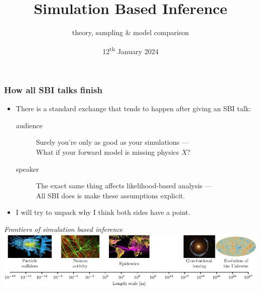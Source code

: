 \documentclass[aspectratio=169]{beamer}
\title{Simulation Based Inference}
\subtitle{theory, sampling \& model comparison}
\date{12\textsuperscript{th} January 2024}
\begin{document}
\begin{frame}
    \titlepage
\end{frame}

\begin{frame}
    \frametitle{How all SBI talks finish}
    \begin{itemize}
        \item There is a standard exchange that tends to happen after giving an SBI talk:

            \begin{description}
                \item[audience] Surely you're only as good as your simulations ---\\What if your forward model is missing physics $X$?
                \item[speaker] The exact same thing affects likelihood-based analysis ---\\
                    All SBI does is make these assumptions explicit.
            \end{description}
        \item I will try to unpack why I think both sides have a point.
    \end{itemize}
    \vspace{10pt}
\hfill \textit{Frontiers of simulation based inference}~
    \includegraphics[width=\textwidth]{figures/sbi_range.pdf}
\end{frame}
\end{document}
